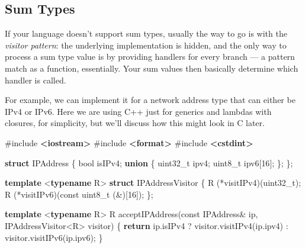 \documentclass[]{article}
\newenvironment{Shaded}{}{}
\newcommand{\AttributeTok}[1]{\textcolor[rgb]{0.49,0.56,0.16}{#1}}
\newcommand{\ControlFlowTok}[1]{\textcolor[rgb]{0.00,0.44,0.13}{\textbf{#1}}}
\newcommand{\DataTypeTok}[1]{\textcolor[rgb]{0.56,0.13,0.00}{#1}}
\newcommand{\DecValTok}[1]{\textcolor[rgb]{0.25,0.63,0.44}{#1}}
\newcommand{\ImportTok}[1]{\textcolor[rgb]{0.00,0.50,0.00}{\textbf{#1}}}
\newcommand{\KeywordTok}[1]{\textcolor[rgb]{0.00,0.44,0.13}{\textbf{#1}}}
\newcommand{\NormalTok}[1]{#1}
\newcommand{\OperatorTok}[1]{\textcolor[rgb]{0.40,0.40,0.40}{#1}}
\newcommand{\PreprocessorTok}[1]{\textcolor[rgb]{0.74,0.48,0.00}{#1}}
\begin{document}
\subsection{Sum Types}\label{sum-types}

If your language doesn't support sum types, usually the way to go is with the
\emph{visitor pattern}: the underlying implementation is hidden, and the only
way to process a sum type value is by providing handlers for every branch --- a
pattern match as a function, essentially. Your sum values then basically
determine which handler is called.

For example, we can implement it for a network address type that can either be
IPv4 or IPv6. Here we are using C++ just for generics and lambdas with closures,
for simplicity, but we'll discuss how this might look in C later.

\begin{Shaded}
\begin{Highlighting}[]
\PreprocessorTok{\#include }\ImportTok{\textless{}iostream\textgreater{}}
\PreprocessorTok{\#include }\ImportTok{\textless{}format\textgreater{}}
\PreprocessorTok{\#include }\ImportTok{\textless{}cstdint\textgreater{}}

\KeywordTok{struct}\NormalTok{ IPAddress }\OperatorTok{\{}
    \DataTypeTok{bool}\NormalTok{ isIPv4}\OperatorTok{;}
    \KeywordTok{union} \OperatorTok{\{}
        \DataTypeTok{uint32\_t}\NormalTok{ ipv4}\OperatorTok{;}
        \DataTypeTok{uint8\_t}\NormalTok{ ipv6}\OperatorTok{[}\DecValTok{16}\OperatorTok{];}
    \OperatorTok{\};}
\OperatorTok{\};}

\KeywordTok{template} \OperatorTok{\textless{}}\KeywordTok{typename}\NormalTok{ R}\OperatorTok{\textgreater{}}
\KeywordTok{struct}\NormalTok{ IPAddressVisitor }\OperatorTok{\{}
\NormalTok{    R }\OperatorTok{(*}\NormalTok{visitIPv4}\OperatorTok{)(}\DataTypeTok{uint32\_t}\OperatorTok{);}
\NormalTok{    R }\OperatorTok{(*}\NormalTok{visitIPv6}\OperatorTok{)(}\AttributeTok{const} \DataTypeTok{uint8\_t} \OperatorTok{(\&)[}\DecValTok{16}\OperatorTok{]);}
\OperatorTok{\};}

\KeywordTok{template} \OperatorTok{\textless{}}\KeywordTok{typename}\NormalTok{ R}\OperatorTok{\textgreater{}}
\NormalTok{R acceptIPAddress}\OperatorTok{(}\AttributeTok{const}\NormalTok{ IPAddress}\OperatorTok{\&}\NormalTok{ ip}\OperatorTok{,}\NormalTok{ IPAddressVisitor}\OperatorTok{\textless{}}\NormalTok{R}\OperatorTok{\textgreater{}}\NormalTok{ visitor}\OperatorTok{)} \OperatorTok{\{}
    \ControlFlowTok{return}\NormalTok{ ip}\OperatorTok{.}\NormalTok{isIPv4 }\OperatorTok{?}\NormalTok{ visitor}\OperatorTok{.}\NormalTok{visitIPv4}\OperatorTok{(}\NormalTok{ip}\OperatorTok{.}\NormalTok{ipv4}\OperatorTok{)}
                     \OperatorTok{:}\NormalTok{ visitor}\OperatorTok{.}\NormalTok{visitIPv6}\OperatorTok{(}\NormalTok{ip}\OperatorTok{.}\NormalTok{ipv6}\OperatorTok{);}
\OperatorTok{\}}
\end{Highlighting}
\end{Shaded}
\end{document}
